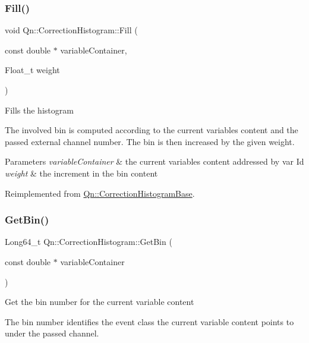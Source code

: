 \subsubsection{\texorpdfstring{Fill()}{Fill()}}
{\footnotesize\ttfamily void Qn\+::\+Correction\+Histogram\+::\+Fill (\begin{DoxyParamCaption}\item[{const double $\ast$}]{variable\+Container,  }\item[{Float\+\_\+t}]{weight }\end{DoxyParamCaption})\hspace{0.3cm}{\ttfamily [virtual]}}

Fills the histogram

The involved bin is computed according to the current variables content and the passed external channel number. The bin is then increased by the given weight.


\begin{DoxyParams}{Parameters}
{\em variable\+Container} & the current variables content addressed by var Id \\
\hline
{\em weight} & the increment in the bin content \\
\hline
\end{DoxyParams}


Reimplemented from \mbox{\hyperlink{classQn_1_1CorrectionHistogramBase_a16b7518942714780ec9ceb56bb517f0f}{Qn\+::\+Correction\+Histogram\+Base}}.

\mbox{\label{classQn_1_1CorrectionHistogram_ac67e334f0d4bae4c45727e129c9bfba1}} 
\subsubsection{\texorpdfstring{Get\+Bin()}{GetBin()}}
{\footnotesize\ttfamily Long64\+\_\+t Qn\+::\+Correction\+Histogram\+::\+Get\+Bin (\begin{DoxyParamCaption}\item[{const double $\ast$}]{variable\+Container }\end{DoxyParamCaption})\hspace{0.3cm}{\ttfamily [virtual]}}

Get the bin number for the current variable content

The bin number identifies the event class the current variable content points to under the passed channel.


